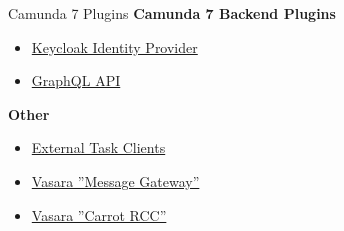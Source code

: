 \documentclass[12pt,aspectratio=169]{beamer}
\begin{document}
\begin{frame}{Camunda 7 Plugins}
\textbf{Camunda 7 Backend Plugins}
\begin{itemize}
\item \href{https://github.com/camunda-community-hub/camunda-platform-7-keycloak}{Keycloak Identity Provider}
\item \href{https://github.com/camunda-community-hub/camunda-platform-7-graphql}{GraphQL API}
\end{itemize}
\textbf{Other}
\begin{itemize}
\item \href{https://github.com/camunda-community-hub/awesome-camunda-7-external-clients}{External Task Clients}
\item \href{https://gitlab.com/vasara-bpm/camunda-message-gateway}{Vasara ''Message Gateway''}
\item \href{https://gitlab.com/vasara-bpm/carrot-rcc}{Vasara ''Carrot RCC''}
\end{itemize}
\end{frame}
\end{document}

